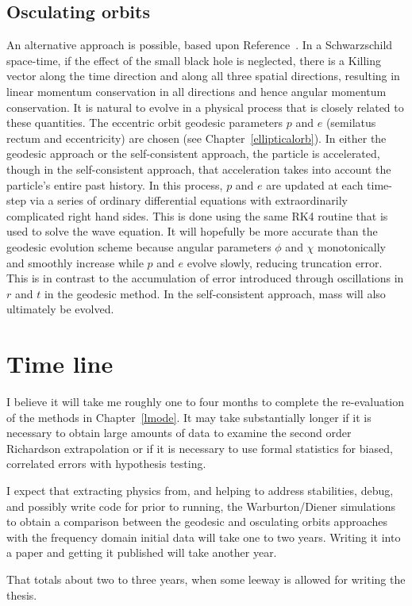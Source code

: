 \subsection{Osculating orbits}

An alternative approach is possible, based upon Reference~\cite{pound_poisson}. In a Schwarzschild space-time, if the effect of the small black hole is neglected, there is a Killing vector along the time direction and along all three spatial directions, resulting in linear momentum conservation in all directions and hence angular momentum conservation. It is natural to evolve in a physical process that is closely related to these quantities. The eccentric orbit geodesic parameters $p$ and $e$ (semilatus rectum and eccentricity) are chosen (see Chapter~\ref{ellipticalorb}). In either the geodesic approach or the self-consistent approach, the particle is accelerated, though in the self-consistent approach, that acceleration takes into account the particle's entire past history. In this process, $p$ and $e$ are updated at each time-step via a series of ordinary differential equations with extraordinarily complicated right hand sides. This is done using the same RK4 routine that is used to solve the wave equation. It will hopefully be more accurate than the geodesic evolution scheme because angular parameters $\phi$ and $\chi$ monotonically and smoothly increase while $p$ and $e$ evolve slowly, reducing truncation error. This is in contrast to the accumulation of error introduced through oscillations in $r$ and $t$ in the geodesic method. In the self-consistent approach, mass will also ultimately be evolved.



\section{Time line}

I believe it will take me roughly one to four months to complete the re-evaluation of the methods in Chapter~\ref{lmode}. It may take substantially longer if it is necessary to obtain large amounts of data to examine the second order Richardson extrapolation or if it is necessary to use formal statistics for biased, correlated errors with hypothesis testing.

I expect that extracting physics from, and helping to address stabilities, debug, and possibly write code for prior to running, the Warburton/Diener simulations to obtain a comparison between the geodesic and osculating orbits approaches with the frequency domain initial data will take one to two years. Writing it into a paper and getting it published will take another year.

That totals about two to three years, when some leeway is allowed for writing the thesis. 



